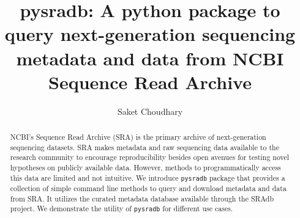 \documentclass[9pt,a4paper]{extarticle}
\begin{document}
\pagestyle{front}
\title{pysradb: A python package to query next-generation sequencing metadata
and data from NCBI Sequence Read Archive}
\author[]{Saket Choudhary}


\maketitle
\thispagestyle{front}


\begin{abstract}

NCBI's Sequence Read Archive (SRA) is the primary archive of next-generation
sequencing datasets. SRA makes metadata and raw sequencing data available to the
research community to encourage reproducibility besides open avenues for testing
novel hypotheses on publicly available data. However, methods to programmatically
access this data are limited and not intuitive. We introduce \texttt{pysradb} package that provides a collection of simple command line methods to query and download metadata and data from SRA. It utilizes the curated metadata database available through the SRAdb project. We demonstrate the utility of \texttt{pysradb} for different use cases.


\end{abstract}
\end{document}
